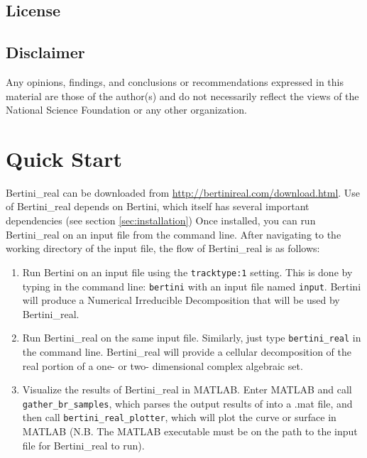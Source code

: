\documentclass[10pt]{article}
\begin{document}
\subsection{License}
\label{sec:license}

\subsection*{Disclaimer}

Any opinions, findings, and conclusions or recommendations expressed in this material are those of the author(s) and do not necessarily reflect the views of the National Science Foundation or any other organization.




\clearpage
\section{Quick Start}
\label{sec:started}

Bertini\_real can be downloaded from \url{http://bertinireal.com/download.html}. Use of Bertini\_real depends on Bertini, which itself has several important dependencies (see section \ref{sec:installation})
Once installed, you can run Bertini\_real on an input file from the command line. After navigating to the working directory of the input file, the flow of Bertini\_real is as follows:
\begin{enumerate}
\item Run Bertini on an input file using the \texttt{tracktype:1} setting. This is done by typing in the command line: \texttt{bertini} with an input file named \texttt{input}. Bertini will produce a Numerical Irreducible Decomposition that will be used by Bertini\_real.
\item Run Bertini\_real on the same input file. Similarly, just type \texttt{bertini\_real} in the command line. Bertini\_real will provide a cellular decomposition of the real portion of a one- or two- dimensional complex algebraic set.
\item Visualize the results of Bertini\_real in MATLAB. Enter MATLAB and call \texttt{gather\_br\_samples}, which parses the output results of  into a .mat file, and then call \texttt{bertini\_real\_plotter}, which will plot the curve or surface in MATLAB (N.B. The MATLAB executable must be on the path to the input file for Bertini\_real to run). 
\end{enumerate}
\end{document}
